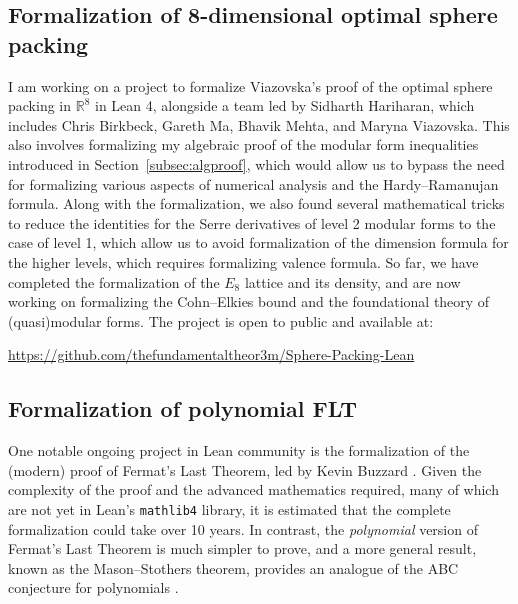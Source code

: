 \documentclass[letterpaper, 10pt]{article}
\begin{document}
\subsection{Formalization of 8-dimensional optimal sphere packing}

I am working on a project to formalize Viazovska's proof of the optimal sphere packing in $\mathbb{R}^{8}$ \cite{viazovska2017sphere} in Lean 4, alongside a team led by Sidharth Hariharan, which includes Chris Birkbeck, Gareth Ma, Bhavik Mehta, and Maryna Viazovska.
This also involves formalizing my algebraic proof of the modular form inequalities introduced in Section~\ref{subsec:algproof}, which would allow us to bypass the need for formalizing various aspects of numerical analysis and the Hardy--Ramanujan formula.
Along with the formalization, we also found several mathematical tricks to reduce the identities for the Serre derivatives of level 2 modular forms to the case of level 1, which allow us to avoid formalization of the dimension formula for the higher levels, which requires formalizing valence formula.
So far, we have completed the formalization of the $E_8$ lattice and its density, and are now working on formalizing the Cohn--Elkies bound and the foundational theory of (quasi)modular forms.
The project is open to public and available at:
\begin{center} \href{https://github.com/thefundamentaltheor3m/Sphere-Packing-Lean}{https://github.com/thefundamentaltheor3m/Sphere-Packing-Lean} \end{center}


\subsection{Formalization of polynomial FLT}

One notable ongoing project in Lean community is the formalization of the (modern) proof of Fermat's Last Theorem, led by Kevin Buzzard \cite{fltlean4}.
Given the complexity of the proof and the advanced mathematics required, many of which are not yet in Lean's \texttt{mathlib4} library, it is estimated that the complete formalization could take over 10 years.
In contrast, the \emph{polynomial} version of Fermat's Last Theorem is much simpler to prove, and a more general result, known as the Mason--Stothers theorem, provides an analogue of the ABC conjecture for polynomials \cite{stothers81,mason84}.
\end{document}
